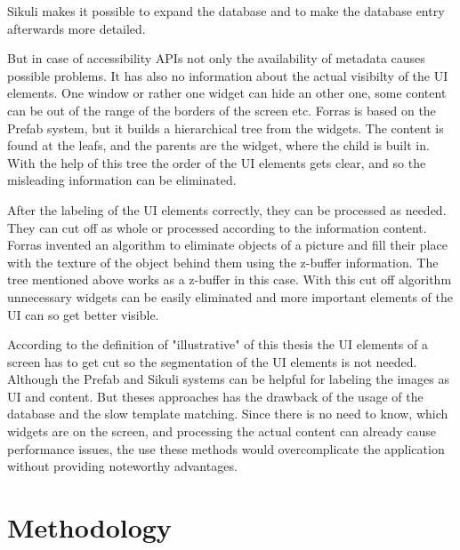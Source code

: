 \documentclass[draft,final]{vutinfth} %
\begin{document}
Sikuli makes it possible to expand the database and to make the database entry afterwards more detailed.\par
But in case of accessibility APIs not only the availability of metadata causes possible problems.
It has also no information about the actual visibilty of the UI elements.
One window or rather one widget can hide an other one, some content can be out of the range of the borders of the screen etc.    
Forras is based on the Prefab system, but it builds a hierarchical tree from the widgets. 
The content is found at the leafs, and the parents are the widget, where the child is built in.
With the help of this tree the order of the UI elements gets clear, and so the misleading information can be eliminated.\par
After the labeling of the UI elements correctly, they can be processed as needed.
They can cut off as whole or processed according to the information content.
Forras invented an algorithm to eliminate objects of a picture and fill their place with the texture of the object behind them using the z-buffer information.
The tree mentioned above works as a z-buffer in this case.
With this cut off algorithm unnecessary widgets can be easily eliminated and more important elements of the UI can so get better visible.\par
According to the definition of "illustrative" of this thesis the UI elements of a screen has to get cut so the segmentation of the UI elements is not needed.
Although the Prefab and Sikuli systems can be helpful for labeling the images as UI and content.
But theses approaches has the drawback of the usage of the database and the slow template matching. 
Since there is no need to know, which widgets are on the screen, and processing the actual content can already cause performance issues, the use these methods would overcomplicate the application without providing noteworthy advantages.


  

\chapter{Methodology}




\backmatter

\listoffigures %

\cleardoublepage %
\listoftables %

\listofalgorithms
{}

\printindex

\printglossaries



\end{document}
